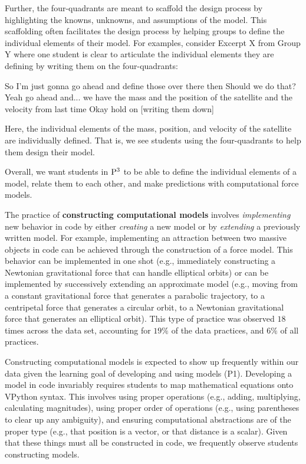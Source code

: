 \documentclass{msuphddissertation}
\begin{document}
\begin{doublespace}
Further, the four-quadrants are meant to scaffold the design process by highlighting the knowns, unknowns, and assumptions of the model.  This scaffolding often facilitates the design process by helping groups to define the individual elements of their model.  For examples, consider Excerpt X from Group Y where one student is clear to articulate the individual elements they are defining by writing them on the four-quadrants: \begin{description}
\SA So I'm just gonna go ahead and define those over there then
\SA [writing on 4Q]
\SA Should we do that?
\SB Yeah go ahead and... we have the mass
\SB and the position of the satellite
\SC and the velocity from last time
\SA Okay hold on [writing them down]
\end{description}  Here, the individual elements of the mass, position, and velocity of the satellite are individually defined.  That is, we see students using the four-quadrants to help them design their model.

Overall, we want students in ${\rm P}^{3}$ to be able to define the individual elements of a model, relate them to each other, and make predictions with computational force models.

The practice of \textbf{constructing computational models} involves \textit{implementing} new behavior in code by either \textit{creating} a new model or by \textit{extending} a previously written model.  For example, implementing an attraction between two massive objects in code can be achieved through the construction of a force model.  This behavior can be implemented in one shot (e.g., immediately constructing a Newtonian gravitational force that can handle elliptical orbits) or can be implemented by successively extending an approximate model (e.g., moving from a constant gravitational force that generates a parabolic trajectory, to a centripetal force that generates a circular orbit, to a Newtonian gravitational force that generates an elliptical orbit).  This type of practice was observed $18$ times across the data set, accounting for $19\%$ of the data practices, and $6\%$ of all practices.

Constructing computational models is expected to show up frequently within our data given the learning goal of developing and using models (P1).  Developing a model in code invariably requires students to map mathematical equations onto VPython syntax.  This involves using proper operations (e.g., adding, multiplying, calculating magnitudes), using proper order of operations (e.g., using parentheses to clear up any ambiguity), and ensuring computational abstractions are of the proper type (e.g., that position is a vector, or that distance is a scalar).  Given that these things must all be constructed in code, we frequently observe students constructing models.


\end{doublespace}
\end{document}
